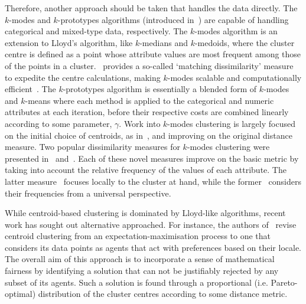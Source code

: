 Therefore, another approach should be taken that handles the data directly. The
\(k\)-modes and \(k\)-prototypes algorithms (introduced in~\cite{Huang1998}) are
capable of handling categorical and mixed-type data, respectively. The
\(k\)-modes algorithm is an extension to Lloyd's algorithm, like \(k\)-medians
and \(k\)-medoids, where the cluster centre is defined as a point whose
attribute values are most frequent among those of the points in a
cluster.~\cite{Huang1998} provides a so-called `matching dissimilarity' measure
to expedite the centre calculations, making \(k\)-modes scalable and
computationally efficient~\cite{Madhuri2014}. The \(k\)-prototypes algorithm is
essentially a blended form of \(k\)-modes and \(k\)-means where each method is
applied to the categorical and numeric attributes at each iteration, before
their respective costs are combined linearly according to some parameter,
\(\gamma\). Work into \(k\)-modes clustering is largely focused on the initial
choice of centroids, as
in~\cite{Cao2009,Jiang2016,Khan2013,Khan2007,Taoying2013,Wilde2020}, and
improving on the original distance measure. Two popular dissimilarity measures
for \(k\)-modes clustering were presented in~\cite{Cao2012} and~\cite{Ng2007}.
Each of these novel measures improve on the basic metric by taking into account
the relative frequency of the values of each attribute. The latter
measure~\cite{Ng2007} focuses locally to the cluster at hand, while the
former~\cite{Cao2012} considers their frequencies from a universal perspective.

While centroid-based clustering is dominated by Lloyd-like algorithms, recent
work has sought out alternative approached. For instance, the authors
of~\cite{Chen2019} revise centroid clustering from an expectation-maximisation
process to one that considers its data points as agents that act with
preferences based on their locale. The overall aim of this approach is to
incorporate a sense of mathematical fairness by identifying a solution that can
not be justifiably rejected by any subset of its agents. Such a solution is
found through a proportional (i.e. Pareto-optimal) distribution of the cluster
centres according to some distance metric.

